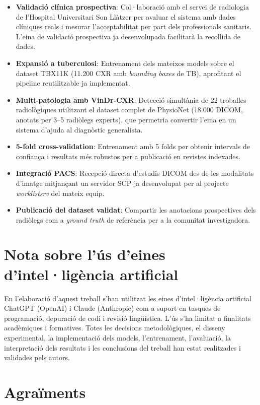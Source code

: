 \begin{itemize}
    \item \textbf{Validació clínica prospectiva}: Col·laboració amb el servei de radiologia de l'Hospital Universitari Son Llàtzer per avaluar el sistema amb dades clíniques reals i mesurar l'acceptabilitat per part dels professionals sanitaris. L'eina de validació prospectiva ja desenvolupada facilitarà la recollida de dades.
    \item \textbf{Expansió a tuberculosi}: Entrenament dels mateixos models sobre el dataset TBX11K (11.200 CXR amb \textit{bounding boxes} de TB), aprofitant el pipeline reutilitzable ja implementat.
    \item \textbf{Multi-patologia amb VinDr-CXR}: Detecció simultània de 22 troballes radiològiques utilitzant el dataset complet de PhysioNet (18.000 DICOM, anotats per 3--5 radiòlegs experts), que permetria convertir l'eina en un sistema d'ajuda al diagnòstic generalista.
    \item \textbf{5-fold cross-validation}: Entrenament amb 5 folds per obtenir intervals de confiança i resultats més robustos per a publicació en revistes indexades.
    \item \textbf{Integració PACS}: Recepció directa d'estudis DICOM des de les modalitats d'imatge mitjançant un servidor SCP ja desenvolupat per al projecte \textit{worklistsrv} del mateix equip.
    \item \textbf{Publicació del dataset validat}: Compartir les anotacions prospectives dels radiòlegs com a \textit{ground truth} de referència per a la comunitat investigadora.
\end{itemize}

\section*{Nota sobre l'ús d'eines d'intel·ligència artificial}

En l'elaboració d'aquest treball s'han utilitzat les eines d'intel·ligència artificial ChatGPT (OpenAI) i Claude (Anthropic) com a suport en tasques de programació, depuració de codi i revisió lingüística. L'ús s'ha limitat a finalitats acadèmiques i formatives. Totes les decisions metodològiques, el disseny experimental, la implementació dels models, l'entrenament, l'avaluació, la interpretació dels resultats i les conclusions del treball han estat realitzades i validades pels autors.

\section*{Agraïments}

